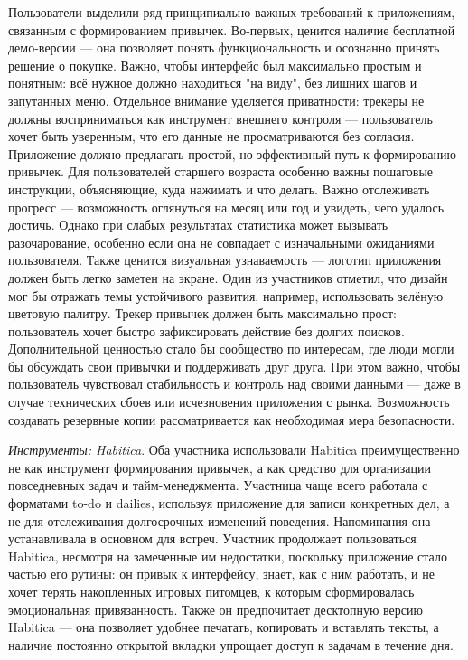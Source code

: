 \documentclass[pdflatex,sn-mathphys-num]{sn-jnl}%
\theoremstyle{thmstyleone}%
\theoremstyle{thmstyletwo}%
\theoremstyle{thmstylethree}%
\begin{document}
Пользователи выделили ряд принципиально важных требований к приложениям, связанным с формированием привычек. Во-первых, ценится наличие бесплатной демо-версии — она позволяет понять функциональность и осознанно принять решение о покупке. Важно, чтобы интерфейс был максимально простым и понятным: всё нужное должно находиться "на виду", без лишних шагов и запутанных меню. Отдельное внимание уделяется приватности: трекеры не должны восприниматься как инструмент внешнего контроля — пользователь хочет быть уверенным, что его данные не просматриваются без согласия. Приложение должно предлагать простой, но эффективный путь к формированию привычек. Для пользователей старшего возраста особенно важны пошаговые инструкции, объясняющие, куда нажимать и что делать. Важно отслеживать прогресс — возможность оглянуться на месяц или год и увидеть, чего удалось достичь. Однако при слабых результатах статистика может вызывать разочарование, особенно если она не совпадает с изначальными ожиданиями пользователя. Также ценится визуальная узнаваемость — логотип приложения должен быть легко заметен на экране. Один из участников отметил, что дизайн мог бы отражать темы устойчивого развития, например, использовать зелёную цветовую палитру. Трекер привычек должен быть максимально прост: пользователь хочет быстро зафиксировать действие без долгих поисков. Дополнительной ценностью стало бы сообщество по интересам, где люди могли бы обсуждать свои привычки и поддерживать друг друга. При этом важно, чтобы пользователь чувствовал стабильность и контроль над своими данными — даже в случае технических сбоев или исчезновения приложения с рынка. Возможность создавать резервные копии рассматривается как необходимая мера безопасности.

\textit{Инструменты: Habitica}. Оба участника использовали Habitica преимущественно не как инструмент формирования привычек, а как средство для организации повседневных задач и тайм-менеджмента. Участница чаще всего работала с форматами to-do и dailies, используя приложение для записи конкретных дел, а не для отслеживания долгосрочных изменений поведения. Напоминания она устанавливала в основном для встреч. Участник продолжает пользоваться Habitica, несмотря на замеченные им недостатки, поскольку приложение стало частью его рутины: он привык к интерфейсу, знает, как с ним работать, и не хочет терять накопленных игровых питомцев, к которым сформировалась эмоциональная привязанность. Также он предпочитает десктопную версию Habitica — она позволяет удобнее печатать, копировать и вставлять тексты, а наличие постоянно открытой вкладки упрощает доступ к задачам в течение дня. 
\end{document}
